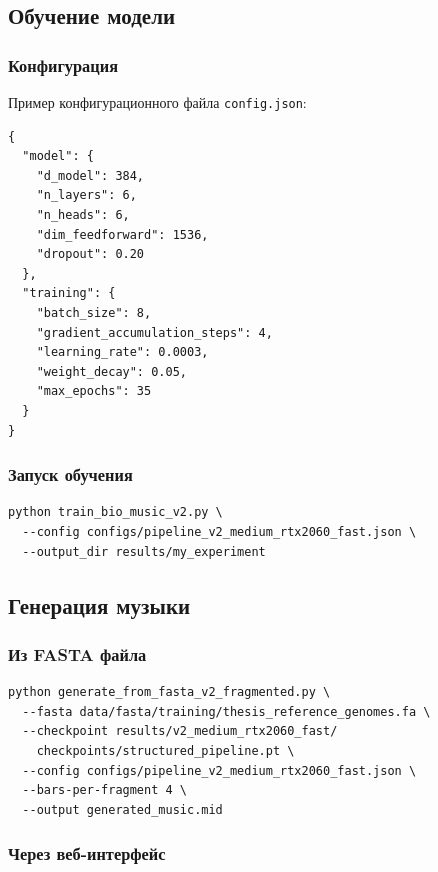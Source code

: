 \subsection{Обучение модели}

\subsubsection{Конфигурация}

Пример конфигурационного файла \texttt{config.json}:

\begin{verbatim}
{
  "model": {
    "d_model": 384,
    "n_layers": 6,
    "n_heads": 6,
    "dim_feedforward": 1536,
    "dropout": 0.20
  },
  "training": {
    "batch_size": 8,
    "gradient_accumulation_steps": 4,
    "learning_rate": 0.0003,
    "weight_decay": 0.05,
    "max_epochs": 35
  }
}
\end{verbatim}

\subsubsection{Запуск обучения}

\begin{verbatim}
python train_bio_music_v2.py \
  --config configs/pipeline_v2_medium_rtx2060_fast.json \
  --output_dir results/my_experiment
\end{verbatim}

\subsection{Генерация музыки}

\subsubsection{Из FASTA файла}

\begin{verbatim}
python generate_from_fasta_v2_fragmented.py \
  --fasta data/fasta/training/thesis_reference_genomes.fa \
  --checkpoint results/v2_medium_rtx2060_fast/
    checkpoints/structured_pipeline.pt \
  --config configs/pipeline_v2_medium_rtx2060_fast.json \
  --bars-per-fragment 4 \
  --output generated_music.mid
\end{verbatim}

\subsubsection{Через веб-интерфейс}

